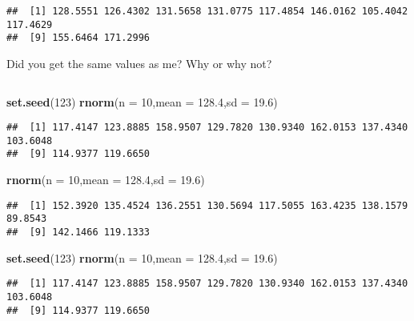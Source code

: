 \documentclass[
]{article}
\newenvironment{Shaded}{\begin{snugshade}}{\end{snugshade}}
\newcommand{\AttributeTok}[1]{\textcolor[rgb]{0.13,0.29,0.53}{#1}}
\newcommand{\DecValTok}[1]{\textcolor[rgb]{0.00,0.00,0.81}{#1}}
\newcommand{\FloatTok}[1]{\textcolor[rgb]{0.00,0.00,0.81}{#1}}
\newcommand{\FunctionTok}[1]{\textcolor[rgb]{0.13,0.29,0.53}{\textbf{#1}}}
\newcommand{\NormalTok}[1]{#1}
\begin{document}
\begin{verbatim}
##  [1] 128.5551 126.4302 131.5658 131.0775 117.4854 146.0162 105.4042 117.4629
##  [9] 155.6464 171.2996
\end{verbatim}

Did you get the same values as me? Why or why not?

\(~\)

\begin{Shaded}
\begin{Highlighting}[]
\FunctionTok{set.seed}\NormalTok{(}\DecValTok{123}\NormalTok{)}
\FunctionTok{rnorm}\NormalTok{(}\AttributeTok{n =} \DecValTok{10}\NormalTok{,}\AttributeTok{mean =} \FloatTok{128.4}\NormalTok{,}\AttributeTok{sd =} \FloatTok{19.6}\NormalTok{)}
\end{Highlighting}
\end{Shaded}

\begin{verbatim}
##  [1] 117.4147 123.8885 158.9507 129.7820 130.9340 162.0153 137.4340 103.6048
##  [9] 114.9377 119.6650
\end{verbatim}

\begin{Shaded}
\begin{Highlighting}[]
\FunctionTok{rnorm}\NormalTok{(}\AttributeTok{n =} \DecValTok{10}\NormalTok{,}\AttributeTok{mean =} \FloatTok{128.4}\NormalTok{,}\AttributeTok{sd =} \FloatTok{19.6}\NormalTok{)}
\end{Highlighting}
\end{Shaded}

\begin{verbatim}
##  [1] 152.3920 135.4524 136.2551 130.5694 117.5055 163.4235 138.1579  89.8543
##  [9] 142.1466 119.1333
\end{verbatim}

\begin{Shaded}
\begin{Highlighting}[]
\FunctionTok{set.seed}\NormalTok{(}\DecValTok{123}\NormalTok{)}
\FunctionTok{rnorm}\NormalTok{(}\AttributeTok{n =} \DecValTok{10}\NormalTok{,}\AttributeTok{mean =} \FloatTok{128.4}\NormalTok{,}\AttributeTok{sd =} \FloatTok{19.6}\NormalTok{)}
\end{Highlighting}
\end{Shaded}

\begin{verbatim}
##  [1] 117.4147 123.8885 158.9507 129.7820 130.9340 162.0153 137.4340 103.6048
##  [9] 114.9377 119.6650
\end{verbatim}
\end{document}
